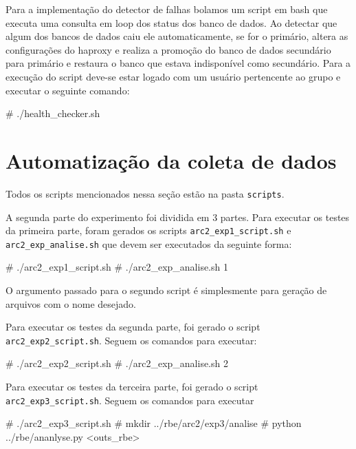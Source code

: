 \documentclass[a4paper,10pt]{article}
\begin{document}
	Para a implementação do detector de falhas bolamos um script em bash que executa uma consulta em loop dos status dos banco de dados. Ao detectar que algum dos bancos de dados caiu ele automaticamente, se for o primário, altera as configurações do haproxy e realiza a promoção do banco de dados secundário para primário e restaura o banco que estava indisponível como secundário. Para a execução do script deve-se estar logado com um usuário pertencente ao grupo e executar o seguinte comando:

       \begin{spverbatim}
# ./health_checker.sh
        \end{spverbatim}

\section{Automatização da coleta de dados}

            Todos os scripts mencionados nessa seção estão na pasta \verb|scripts|.

	A segunda parte do experimento foi dividida em 3 partes. Para executar os testes da primeira parte, foram gerados os scripts \verb|arc2_exp1_script.sh| e \verb|arc2_exp_analise.sh| que devem ser executados da seguinte forma:

 	\begin{spverbatim}
	# ./arc2_exp1_script.sh
	# ./arc2_exp_analise.sh 1
	\end{spverbatim}
\noindent
\newline
O argumento passado para o segundo script é simplesmente para geração de arquivos com o nome desejado.
\newline

Para executar os testes da segunda parte, foi gerado o script \verb|arc2_exp2_script.sh|. Seguem os comandos para executar:
	\begin{spverbatim}
	# ./arc2_exp2_script.sh
	# ./arc2_exp_analise.sh 2
	\end{spverbatim}
\noindent
\newline
Para executar os testes da terceira parte, foi gerado o script \verb|arc2_exp3_script.sh|. Seguem os comandos para executar
	\begin{spverbatim}
	# ./arc2_exp3_script.sh
	# mkdir ../rbe/arc2/exp3/analise
	# python ../rbe/ananlyse.py <outs_rbe>
	\end{spverbatim}
\end{document}
